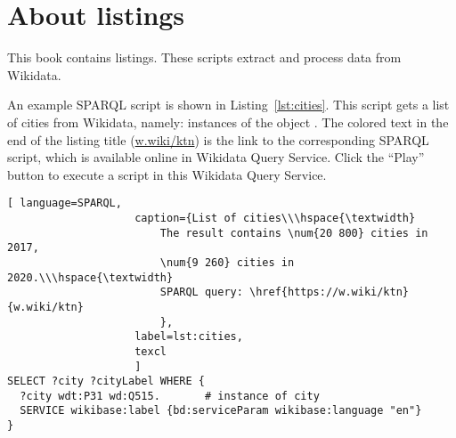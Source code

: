 
\section{About listings}

This book contains  listings.
These scripts extract and process data from Wikidata.%

An example SPARQL script is shown in Listing~\ref{lst:cities}. 
This script gets a list of cities from Wikidata, 
namely: instances of the object .
The colored text in the end of the listing title 
(\href{https://w.wiki/ktn}{w.wiki/ktn}) 
is the link to the corresponding SPARQL script,  
which is available online in Wikidata Query Service. 
Click the ``Play'' button to execute a script in this Wikidata Query Service. 

\begin{lstlisting}[ language=SPARQL, 
                    caption={List of cities\\\hspace{\textwidth}
                        The result contains \num{20 800} cities in 2017, 
                        \num{9 260} cities in 2020.\\\hspace{\textwidth}
                        SPARQL query: \href{https://w.wiki/ktn}{w.wiki/ktn}
                        },
                    label=lst:cities,
                    texcl 
                    ]
SELECT ?city ?cityLabel WHERE { 
  ?city wdt:P31 wd:Q515.       # instance of city 
  SERVICE wikibase:label {bd:serviceParam wikibase:language "en"}
}
\end{lstlisting}%



